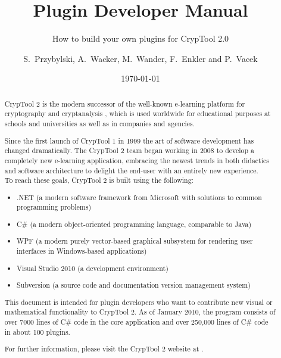 \documentclass[11pt, a4paper, titlepage, appendixprefix]{scrreprt}
\title{Plugin Developer Manual}
\subtitle{How to build your own plugins for CrypTool 2.0}
\author{S.\ Przybylski, A.\ Wacker, M.\ Wander, F.\ Enkler and P.\ Vacek}
\date{\today}
\makeatletter
\newcommand\WaterMarkPic{%
    \setlength{\@tempdimb}{1.85cm}%
    \setlength{\@tempdimc}{2.7cm}%
    \setlength{\unitlength}{1pt}%
    \put(\strip@pt\@tempdimb,\strip@pt\@tempdimc){
            \texttt{[image: figures/ct\_logo\_watermark]}%
    }
}
\makeatother
\begin{document}
	\maketitle

	\begin{abstract}
CrypTool 2 is the modern successor of the well-known e-learning platform for cryptography and cryptanalysis , which is used worldwide for educational purposes at schools and universities as well as in companies and agencies.

Since the first launch of CrypTool 1 in 1999 the art of software development has changed dramatically. The CrypTool 2 team began working in 2008 to develop a completely new e-learning application, embracing the newest trends in both didactics and software architecture to delight the end-user with an entirely new experience.\\

To reach these goals, CrypTool 2 is built using the following:

\begin{itemize}
	\item .NET (a modern software framework from Microsoft with solutions to common programming problems)
	\item C\# (a modern object-oriented programming language, comparable to Java)
    \item WPF (a modern purely vector-based graphical subsystem for rendering user interfaces in Windows-based applications)
    \item Visual Studio 2010 (a development environment)
	\item Subversion (a source code and documentation version management system)
\end{itemize}

This document is intended for plugin developers who want to contribute new visual or mathematical functionality to CrypTool 2. As of January 2010, the program consists of over 7000 lines of C\# code in the core application and over 250,000 lines of C\# code in about 100 plugins.

For further information, please visit the CrypTool 2 website at .
    \end{abstract}

	\tableofcontents
    \listoffigures


	
	
	
	\begin{appendix}
	
	\end{appendix}
\end{document}
